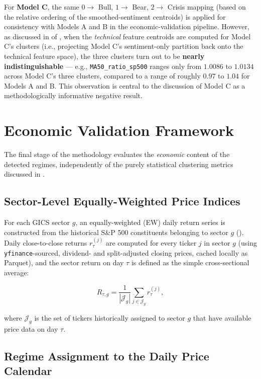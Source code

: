 For \textbf{Model C}, the same $0 \to$ Bull, $1 \to$ Bear, $2 \to$ Crisis
mapping (based on the relative ordering of the smoothed-sentiment
centroids) is applied for consistency with Models A and B in the
economic-validation pipeline. However, as discussed in
 of , when the \emph{technical}
feature centroids are computed for Model C's clusters (i.e., projecting
Model C's sentiment-only partition back onto the technical feature space),
the three clusters turn out to be \textbf{nearly indistinguishable} ---
e.g., \texttt{MA50\_ratio\_sp500} ranges only from $1.0086$ to $1.0134$
across Model C's three clusters, compared to a range of roughly $0.97$ to
$1.04$ for Models A and B. This observation is central to the discussion
of Model C as a methodologically informative negative result.

\section{Economic Validation Framework}
\label{sec:meth-validation}

The final stage of the methodology evaluates the \emph{economic} content
of the detected regimes, independently of the purely statistical
clustering metrics discussed in .

\subsection{Sector-Level Equally-Weighted Price Indices}

For each GICS sector $g$, an equally-weighted (EW) daily return series is
constructed from the historical S\&P 500 constituents belonging to sector
$g$ (). Daily close-to-close returns
$r_{\tau}^{(j)}$ are computed for every ticker $j$ in sector $g$ (using
\texttt{yfinance}-sourced, dividend- and split-adjusted closing prices,
cached locally as Parquet), and the sector return on day $\tau$ is defined
as the simple cross-sectional average:

\begin{equation}
  \label{eq:sector-return}
  R_{\tau,g} = \frac{1}{|\mathcal{J}_g|} \sum_{j \in \mathcal{J}_g} r_\tau^{(j)},
\end{equation}

where $\mathcal{J}_g$ is the set of tickers historically assigned to
sector $g$ that have available price data on day $\tau$.

\subsection{Regime Assignment to the Daily Price Calendar}

